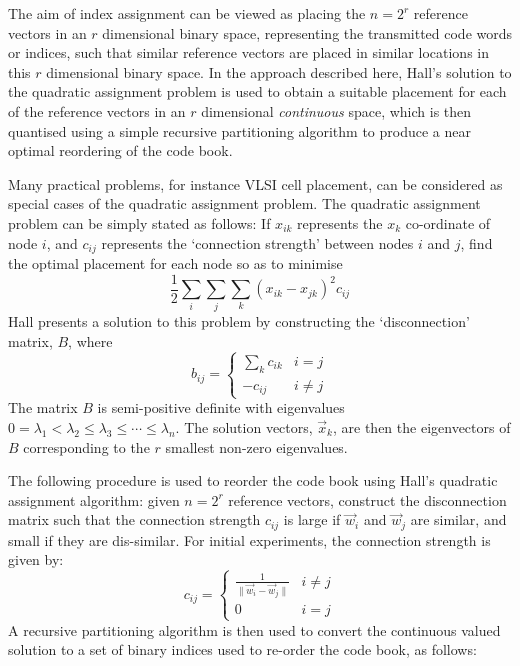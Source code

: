 \documentclass[a4paper]{report}
\begin{document}

The aim of index assignment can be viewed as placing the $n=2^r$ reference
vectors in an $r$ dimensional binary space, representing the transmitted code
words or indices, such that similar reference vectors are placed in similar
locations in this $r$ dimensional binary space.  In the approach described
here, Hall's solution to the quadratic assignment problem is used
to obtain a suitable placement for each of the reference vectors in an $r$
dimensional \emph{continuous} space, which is then quantised using a simple
recursive partitioning algorithm to produce a near optimal reordering of the
code book.


Many practical problems, for instance VLSI cell placement, can
be considered as special cases of the quadratic assignment problem.  The
quadratic assignment problem can be simply stated as follows:  If $x_{ik}$
represents the $x_k$ co-ordinate of node $i$, and $c_{ij}$ represents the
`connection strength' between nodes $i$ and $j$, find the optimal placement
for each node so as to minimise
%
\begin{displaymath}
   \frac{1}{2}\sum_i\sum_j\sum_k(x_{ik}-x_{jk})^2c_{ij}
\end{displaymath}
%
Hall presents a solution to this problem by constructing the
`disconnection' matrix, $B$, where
%
\begin{displaymath}
   b_{ij} =
   \left\{
   \begin{array}{ll}
   \sum_k c_{ik} & i = j\\
   -c_{ij} & i \neq j
   \end{array}
   \right.
\end{displaymath}
%
The matrix $B$ is semi-positive definite with eigenvalues
$0 = \lambda_1 < \lambda_2 \leq \lambda_3 \leq \cdots \leq \lambda_n$.
The solution vectors, $\vec{x}_k$, are then the eigenvectors of $B$
corresponding to the $r$ smallest non-zero eigenvalues.


The following procedure is used to reorder the code book using Hall's
quadratic assignment algorithm: given $n=2^r$ reference vectors, construct the
disconnection matrix such that the connection strength $c_{ij}$ is large
if $\vec{w}_i$ and $\vec{w}_j$ are similar, and small if they are
dis-similar.  For initial experiments, the connection strength is given by:
\begin{displaymath}
c_{ij} =
\left\{
\begin{array}{cl}
\frac{1}{\|\vec{w}_i - \vec{w}_j\|} & i \neq j\\
0 & i = j
\end{array}
\right.
\end{displaymath}
A recursive partitioning algorithm is then used to convert the continuous valued
solution to a set of binary indices used to re-order the code book, as follows:
\end{document}
